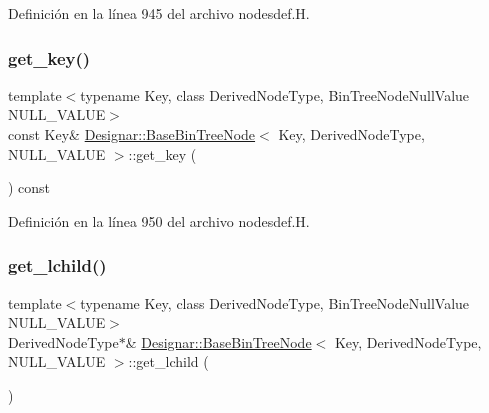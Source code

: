 Definición en la línea 945 del archivo nodesdef.\+H.

\mbox{\label{class_designar_1_1_base_bin_tree_node_ab836466417ce1dad15b794424f39ee4b}} 
\subsubsection{\texorpdfstring{get\+\_\+key()}{get\_key()}\hspace{0.1cm}{\footnotesize\ttfamily [2/2]}}
{\footnotesize\ttfamily template$<$typename Key, class Derived\+Node\+Type, Bin\+Tree\+Node\+Null\+Value N\+U\+L\+L\+\_\+\+V\+A\+L\+UE$>$ \\
const Key\& \hyperlink{class_designar_1_1_base_bin_tree_node}{Designar\+::\+Base\+Bin\+Tree\+Node}$<$ Key, Derived\+Node\+Type, N\+U\+L\+L\+\_\+\+V\+A\+L\+UE $>$\+::get\+\_\+key (\begin{DoxyParamCaption}{ }\end{DoxyParamCaption}) const\hspace{0.3cm}{\ttfamily [inline]}}



Definición en la línea 950 del archivo nodesdef.\+H.

\mbox{\label{class_designar_1_1_base_bin_tree_node_a60f8c88c08e4b68ecc9dd9a77b69cb7c}} 
\subsubsection{\texorpdfstring{get\+\_\+lchild()}{get\_lchild()}}
{\footnotesize\ttfamily template$<$typename Key, class Derived\+Node\+Type, Bin\+Tree\+Node\+Null\+Value N\+U\+L\+L\+\_\+\+V\+A\+L\+UE$>$ \\
Derived\+Node\+Type$\ast$\& \hyperlink{class_designar_1_1_base_bin_tree_node}{Designar\+::\+Base\+Bin\+Tree\+Node}$<$ Key, Derived\+Node\+Type, N\+U\+L\+L\+\_\+\+V\+A\+L\+UE $>$\+::get\+\_\+lchild (\begin{DoxyParamCaption}{ }\end{DoxyParamCaption})\hspace{0.3cm}{\ttfamily [inline]}}



